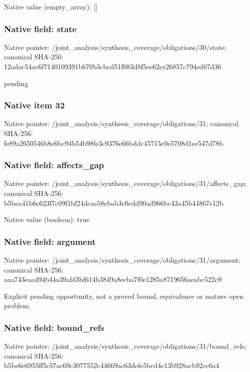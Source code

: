 \documentclass[10pt,a4paper]{article}
\begin{document}
Native value (empty\_\allowbreak{}array): []

\subsubsection{Native field: state}
Native pointer: /joint\_\allowbreak{}analysis/synthesis\_\allowbreak{}coverage/obligations/30/state; canonical SHA-256: 12adac54ac6f7140109391b670b3cbcd51f083d8f5ee62ce26857c794ed67d36

\begingroup\raggedright\sloppy pending\par\endgroup

\subsubsection{Native item 32}
Native pointer: /joint\_\allowbreak{}analysis/synthesis\_\allowbreak{}coverage/obligations/31; canonical SHA-256: fe89a2650546b8e6bc94b54b98fe3c9376e66bddc45715c0e5708d1ee547d78b

\subsubsection{Native field: affects\_\allowbreak{}gap}
Native pointer: /joint\_\allowbreak{}analysis/synthesis\_\allowbreak{}coverage/obligations/31/affects\_\allowbreak{}gap; canonical SHA-256: b5bea41b6c623f7c09f1bf24dcae58ebab3c0cdd90ad966bc43a45b44867e12b

Native value (boolean): true

\subsubsection{Native field: argument}
Native pointer: /joint\_\allowbreak{}analysis/synthesis\_\allowbreak{}coverage/obligations/31/argument; canonical SHA-256: aaa743eaa494b44a39afd3bf614b3849a8ecba7f0e1285a8719656aeabc522c9

\begingroup\raggedright\sloppy Explicit pending opportunity,\allowbreak{} not a proved bound,\allowbreak{} equivalence or mature open problem.\par\endgroup

\subsubsection{Native field: bound\_\allowbreak{}refs}
Native pointer: /joint\_\allowbreak{}analysis/synthesis\_\allowbreak{}coverage/obligations/31/bound\_\allowbreak{}refs; canonical SHA-256: b5be6e6955ff5c57ac69c3077552c44669ac63defe5bcd4e13b928acb92cc6a4
\end{document}
